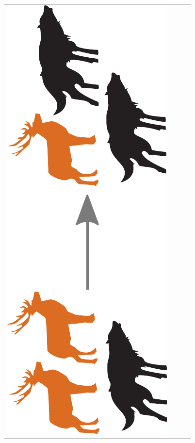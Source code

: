\documentclass[12pt]{beamer}
\begin{document}
\begin{frame}
\begin{tabular}{ r c c c }
      \includegraphics[scale=0.12,angle=-90]{Bilder/lv_mix.pdf}
      &

\end{tabular}
\end{frame}
\end{document}
